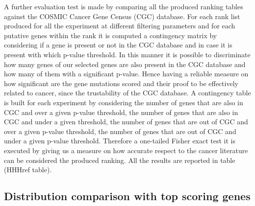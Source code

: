 A further evaluation test is made by comparing all the produced ranking tables against the COSMIC Cancer Gene Census (CGC) database. For each rank list produced for all the experiment at different filtering parameters and for each putative genes within the rank it is computed a contingency matrix by considering if a gene is present or not in the CGC database and in case it is present with which p-value threshold. In this manner it is possible to discriminate how many genes of our selected genes are also present in the CGC database and how many of them with a significant p-value. Hence having a reliable measure on how significant are the gene mutations scored and their proof to be effectively related to cancer, since the trustability of the CGC database. A contingency table is built for each experiment by considering the number of genes that are also in CGC and over a given p-value threshold, the number of genes that are also in CGC and under a given threshold, the number of genes that are out of CGC and over a given p-value threshold, the number of genes that are out of CGC and under a given p-value threshold. Therefore a one-tailed Fisher exact test it is executed by giving us a measure on how accurate respect to the cancer literature can be considered the produced ranking. All the results are reported in table (HHHref table).



\subsection{Distribution comparison with top scoring genes}
